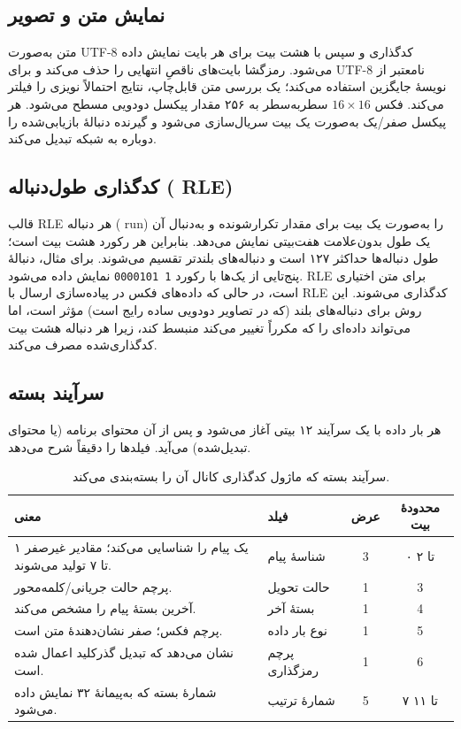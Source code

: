 \documentclass[12pt,a4paper]{article}
\providecommand{\lr}[1]{\foreignlanguage{english}{\begingroup\hyphenchar\font=-1 #1\endgroup}}
\newcommand{\code}[1]{\lr{\texttt{#1}}}
\begin{document}
\subsection{نمایش متن و تصویر}
متن به‌صورت \lr{UTF-8} کدگذاری و سپس با هشت بیت برای هر بایت نمایش داده می‌شود. رمزگشا بایت‌های ناقصِ انتهایی را حذف می‌کند و برای \lr{UTF-8} نامعتبر از نویسۀ جایگزین استفاده می‌کند؛ یک بررسی متن قابل‌چاپ، نتایج احتمالاً نویزی را فیلتر می‌کند. فکس $16\times16$ سطر‌به‌سطر به ۲۵۶ مقدار پیکسل دودویی مسطح می‌شود. هر پیکسل صفر/یک به‌صورت یک بیت سریال‌سازی می‌شود و گیرنده دنبالۀ بازیابی‌شده را دوباره به شبکه تبدیل می‌کند.

\subsection{کدگذاری طول‌دنباله (\lr{RLE})}
قالب \lr{RLE} هر دنباله (\lr{run}) را به‌صورت یک بیت برای مقدار تکرارشونده و به‌دنبال آن یک طول بدون‌علامت هفت‌بیتی نمایش می‌دهد. بنابراین هر رکورد هشت بیت است؛ طول دنباله‌ها حداکثر ۱۲۷ است و دنباله‌های بلندتر تقسیم می‌شوند. برای مثال، دنبالۀ پنج‌تایی از یک‌ها با رکورد \code{1 0000101} نمایش داده می‌شود. \lr{RLE} برای متن اختیاری است، در حالی که داده‌های فکس در پیاده‌سازی ارسال با \lr{RLE} کدگذاری می‌شوند. این روش برای دنباله‌های بلند (که در تصاویر دودویی ساده رایج است) مؤثر است، اما می‌تواند داده‌ای را که مکرراً تغییر می‌کند منبسط کند، زیرا هر دنباله هشت بیت کدگذاری‌شده مصرف می‌کند.

\subsection{سرآیند بسته}
هر بار داده با یک سرآیند ۱۲ بیتی آغاز می‌شود و پس از آن محتوای برنامه (یا محتوای تبدیل‌شده) می‌آید.  فیلدها را دقیقاً شرح می‌دهد.

\begin{table}[ht]
\centering
\begin{tabularx}{\textwidth}{@{}Xlcc@{}}
\toprule
\textbf{معنی} & \textbf{فیلد} & \textbf{عرض} & \textbf{محدودۀ بیت} \\
\midrule
یک پیام را شناسایی می‌کند؛ مقادیر غیرصفر ۱ تا ۷ تولید می‌شوند. & شناسۀ پیام & 3 & ۰ تا ۲ \\
پرچم حالت جریانی/کلمه‌محور. & حالت تحویل & 1 & 3 \\
آخرین بستۀ پیام را مشخص می‌کند. & بستۀ آخر & 1 & 4 \\
پرچم فکس؛ صفر نشان‌دهندۀ متن است. & نوع بار داده & 1 & 5 \\
نشان می‌دهد که تبدیل گذرکلید اعمال شده است. & پرچم رمزگذاری & 1 & 6 \\
شمارۀ بسته که به‌پیمانۀ ۳۲ نمایش داده می‌شود. & شمارۀ ترتیب & 5 & ۷ تا ۱۱ \\
\bottomrule
\end{tabularx}
\caption{سرآیند بسته که ماژول کدگذاری کانال آن را بسته‌بندی می‌کند.}
\label{tab:header}
\end{table}
\end{document}

